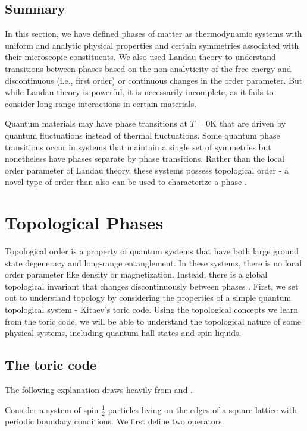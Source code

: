\subsection{Summary}
In this section, we have defined phases of matter as thermodynamic systems with uniform and analytic physical properties and certain symmetries associated with their microscopic constituents. We also used Landau theory to understand transitions between phases based on the non-analyticity of the free energy and discontinuous (i.e., first order) or continuous changes in the order parameter. But while Landau theory is powerful, it is necessarily incomplete, as it fails to consider long-range interactions in certain materials.

Quantum materials may have phase transitions at $T = 0$K that are driven by quantum fluctuations instead of thermal fluctuations. Some quantum phase transitions occur in systems that maintain a single set of symmetries but nonetheless have phases separate by phase transitions. Rather than the local order parameter of Landau theory, these systems possess topological order - a novel type of order than also can be used to characterize a phase \cite{Wen1990}.

\section{Topological Phases}

Topological order is a property of quantum systems that have both large ground state degeneracy and long-range entanglement. In these systems, there is no local order parameter like density or magnetization. Instead, there is a global topological invariant that changes discontinuously between phases \cite{Wen2017}. First, we set out to understand topology by considering the properties of a simple quantum topological system - Kitaev's toric code. Using the topological concepts we learn from the toric code, we will be able to understand the topological nature of some physical systems, including quantum hall states and spin liquids.

\subsection{The toric code}

The following explanation draws heavily from \cite{Kitaev2003} and \cite{topOrderEdX}.

Consider a system of spin-$\frac{1}{2}$ particles living on the edges of a square lattice with periodic boundary conditions. We first define two operators:

